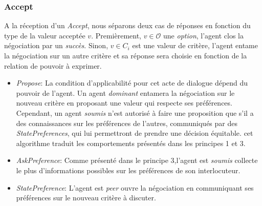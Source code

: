 			 
	
		\subsubsection{Accept }
			A la réception	d'un \emph{Accept}, nous séparons deux cas de réponses en fonction du type de la valeur acceptée $v$.
			Premièrement, $ v \in \mathcal{O}$ une \textit{option}, l'agent clos la négociation par un \emph{succès}.
			Sinon, $v \in C_i$ est une valeur de critère, l'agent entame la négociation sur un autre critère et sa réponse sera choisie en fonction de la relation de pouvoir à exprimer.
			
			\begin{itemize}
				\item \emph{Propose}: La condition d'applicabilité pour cet acte de dialogue dépend du pouvoir de l'agent. Un agent \emph{dominant} entamera la négociation sur le nouveau critère en proposant une valeur qui respecte ses préférences. Cependant, un agent \emph{soumis} n'est autorisé à faire une proposition que s'il a des connaissances sur les préférences de l'autres,  communiqués par des \emph{StatePreferences}, qui lui permettront de prendre une décision équitable. cet algorithme traduit les comportements présentés dans les principes 1 et 3. 
				
				\item \emph{AskPreference}: Comme présenté dans le principe 3,l'agent est \emph{soumis} collecte le plus d'informations possibles sur les préférences de son interlocuteur. 
				\item \emph{StatePreference}: L'agent est \emph{peer} ouvre la négociation en communiquant ses préférences sur le nouveau critère à discuter. 
				
			\end{itemize}
			
%						
%				
				
